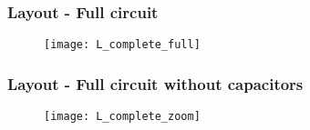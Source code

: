 \begin{frame}
	\frametitle{Layout - Full circuit}
	\begin{figure}[H]
		\centering
		\texttt{[image: L\_complete\_full]}
		\label{L_complete_full}
	\end{figure}
\end{frame}

\begin{frame}
	\frametitle{Layout - Full circuit without capacitors}
	\begin{figure}[H]
		\centering
		\texttt{[image: L\_complete\_zoom]}
		\label{L_complete_zoom}
	\end{figure}
\end{frame}